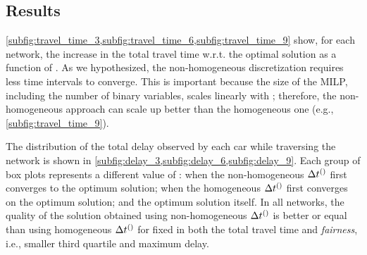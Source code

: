 

\subsection{Results}

%
\cref{subfig:travel_time_3,subfig:travel_time_6,subfig:travel_time_9} show, for
each network, the increase in the total travel time w.r.t. the optimal solution
as a function of \Nn.
%
As we hypothesized, the non-homogeneous discretization requires less time
intervals to converge.
%
This is important because the size of the MILP, including the number of binary
variables, scales linearly with \Nn; therefore, the non-homogeneous approach can
scale up better than the homogeneous one (e.g., \cref{subfig:travel_time_9}).


The distribution of the total delay observed by each car while traversing the
network is shown in \cref{subfig:delay_3,subfig:delay_6,subfig:delay_9}.
%
Each group of box plots represents a different value of \Nn: when the
non-homogeneous $\DT[]$ first converges to the optimum solution; when the
homogeneous $\DT[]$ first converges on the optimum solution; and the optimum
solution itself.
%
In all networks, the quality of the solution obtained using non-homogeneous
$\DT[]$ is better or equal than using homogeneous $\DT[]$ for fixed \Nn in both
the total travel time and \emph{fairness}, i.e., smaller third quartile and
maximum delay.

